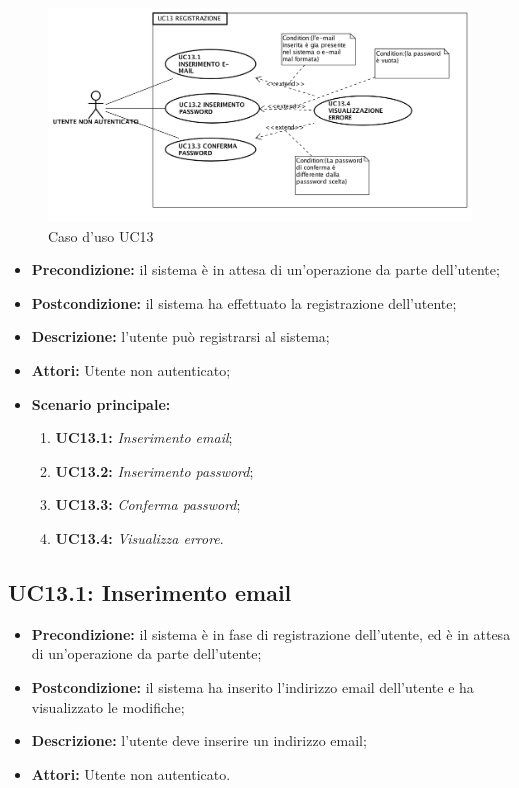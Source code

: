 \begin{figure}[h]
	\begin{center}
	\includegraphics[scale=0.4]{diagram/UC13.png}
	\caption{Caso d'uso UC13}
	\end{center}
\end{figure}
\begin{itemize}
	\item \textbf{Precondizione:} il sistema è in attesa di un'operazione da parte dell'utente;
	\item \textbf{Postcondizione:} il sistema ha effettuato la registrazione dell'utente;
	\item \textbf{Descrizione:} l'utente può registrarsi al sistema;
	\item \textbf{Attori:} Utente non autenticato;
	\item \textbf{Scenario principale:}
	\begin{enumerate}
		\item \textbf{ UC13.1:} \textit{ Inserimento email};
		\item \textbf{ UC13.2:} \textit{ Inserimento password};
		\item \textbf{ UC13.3:} \textit{ Conferma password};
		\item \textbf{ UC13.4:} \textit{ Visualizza errore}.
	\end{enumerate}
\end{itemize}
\subsection{ UC13.1: Inserimento email}

\begin{itemize}
	\item \textbf{Precondizione:} il sistema è in fase di registrazione dell'utente, ed è in attesa di un'operazione da parte dell'utente;
	\item \textbf{Postcondizione:} il sistema ha inserito l'indirizzo email dell'utente e ha visualizzato le modifiche;
	\item \textbf{Descrizione:} l'utente deve inserire un indirizzo email;
	\item \textbf{Attori:} Utente non autenticato.
\end{itemize}
